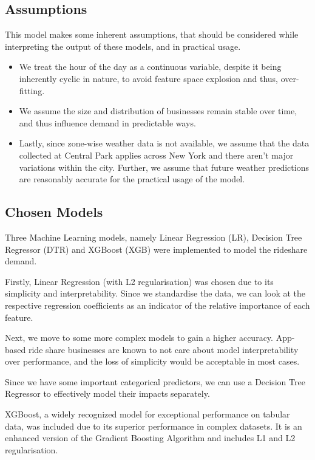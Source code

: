 \documentclass[11pt]{article}
\begin{document}
\subsection{Assumptions}
This model makes some inherent assumptions, that should be considered while interpreting the output of these models, and in practical usage.
\begin{itemize} 
    \item We treat the hour of the day as a continuous variable, despite it being inherently cyclic in nature, to avoid feature space explosion and thus, over-fitting.
    \item We assume the size and distribution of businesses remain stable over time, and thus influence demand in predictable ways.
    \item Lastly, since zone-wise weather data is not available, we assume that the data collected at Central Park applies across New York and there aren’t major variations within the city. Further, we assume that future weather predictions are reasonably accurate for the practical usage of the model.
\end{itemize}
\subsection{Chosen Models}
Three Machine Learning models, namely Linear Regression (LR), Decision Tree Regressor (DTR) and XGBoost (XGB) were implemented to model the rideshare demand.

Firstly, Linear Regression (with L2 regularisation) was chosen due to its simplicity and interpretability. Since we standardise the data, we can look at the respective regression coefficients as an indicator of the relative importance of each feature.

Next, we move to some more complex models to gain a higher accuracy. App-based ride share businesses are known to not care about model interpretability over performance, and the loss of simplicity would be acceptable in most cases.

Since we have some important categorical predictors, we can use a Decision Tree Regressor to effectively model their impacts separately.

XGBoost, a widely recognized model for exceptional performance on tabular data, was included due to its superior performance in complex datasets\cite{xgboost}. It is an enhanced version of the Gradient Boosting Algorithm and includes L1 and L2 regularisation\cite{xgboost}.
\end{document}
